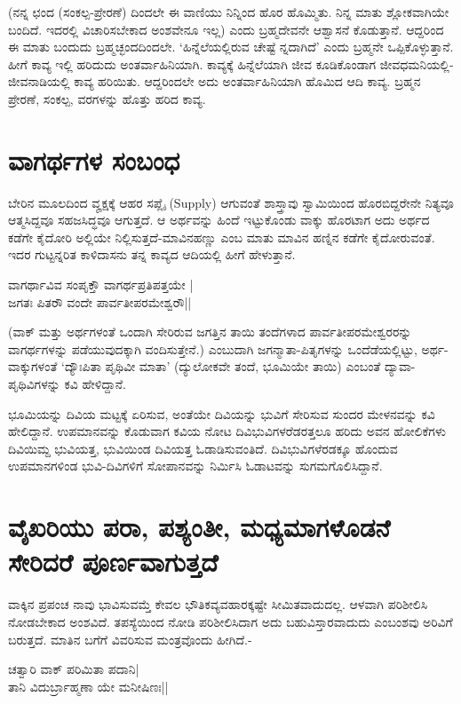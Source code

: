 (ನನ್ನ ಛಂದ (ಸಂಕಲ್ಪ-ಪ್ರೇರಣೆ) ದಿಂದಲೇ ಈ ವಾಣಿಯು ನಿನ್ನಿಂದ ಹೊರ ಹೊಮ್ಮಿತು. ನಿನ್ನ ಮಾತು ಶ್ಲೋಕವಾಗಿಯೇ ಬಂದಿದೆ. ಇದರಲ್ಲಿ ವಿಚಾರಿಸಬೇಕಾದ ಅಂಶವೇನೂ ಇಲ್ಲ) ಎಂದು ಬ್ರಹ್ಮದೇವನೇ ಆಶ್ವಾಸನೆ ಕೊಡುತ್ತಾನೆ. ಆದ್ದರಿಂದ ಈ ಮಾತು ಬಂದುದು ಬ್ರಹ್ಮಚ್ಛಂದದಿಂದಲೇ. `ಹಿನ್ನೆಲೆಯಲ್ಲಿರುವ ಚೇಷ್ಟೆ  ನ್ನದಾಗಿದೆ' ಎಂದು ಬ್ರಹ್ಮನೇ ಒಪ್ಪಿಕೊಳ್ಳುತ್ತಾನೆ. ಹೀಗೆ ಕಾವ್ಯ ಇಲ್ಲಿ ಹರಿದುದು ಅಂತರ್ವಾಹಿನಿಯಾಗಿ. ಕಾವ್ಯಕ್ಕೆ ಹಿನ್ನೆಲೆಯಾಗಿ ಜೀವ ಕೂಡಿಕೊಂಡಾಗ ಜೀವಧಮನಿಯಲ್ಲಿ- ಜೀವನಾಡಿಯಲ್ಲಿ ಕಾವ್ಯ ಹರಿಯಿತು. ಆದ್ದರಿಂದಲೇ ಅದು ಅಂತರ್ವಾಹಿನಿಯಾಗಿ ಹೊಮಿದ ಆದಿ ಕಾವ್ಯ. ಬ್ರಹ್ಮನ ಪ್ರೇರಣೆ, ಸಂಕಲ್ಪ, ವರಗಳನ್ನು ಹೊತ್ತು ಹರಿದ ಕಾವ್ಯ. 

\section*{ವಾಗರ್ಥಗಳ ಸಂಬಂಧ}

ಬೇರಿನ ಮೂಲದಿಂದ ವೄಕ್ಷಕ್ಕೆ  ಆಹರ ಸಪ್ಲೈ (Supply) ಆಗುವಂತೆ ಶಾಸ್ತ್ರಾವು ಸ್ವಾಮಿಯಿಂದ ಹೊರಬಿದ್ದರೇನೇ ನಿತ್ಯವೂ ಆತ್ಮಸಿದ್ದವೂ ಸಹಜಸಿದ್ಧವೂ ಆಗುತ್ತದೆ. ಆ ಅರ್ಥವನ್ನು ಹಿಂದೆ ಇಟ್ಟುಕೊಂಡು ವಾಕ್ಕು ಹೊರಟಾಗ ಅದು ಅರ್ಥದ ಕಡೆಗೇ ಕೈದೋರಿ ಅಲ್ಲಿಯೇ ನಿಲ್ಲಿಸುತ್ತದೆ-ಮಾವಿನಹಣ್ಣು ಎಂಬ ಮಾತು ಮಾವಿನ ಹಣ್ನಿನ ಕಡೆಗೇ ಕೈದೋರುವಂತೆ. ಇದರ ಗುಟ್ಟನ್ನರಿತ ಕಾಳಿದಾಸನು ತನ್ನ ಕಾವ್ಯದ ಆದಿಯಲ್ಲಿ ಹೀಗೆ ಹೇಳುತ್ತಾನೆ.

\begin{shloka}
ವಾಗರ್ಥಾವಿವ ಸಂಪೃಕ್ತೌ ವಾಗರ್ಥಪ್ರತಿಪತ್ತಯೇ |\\
ಜಗತಃ ಪಿತರೌ ವಂದೇ ಪಾರ್ವತೀಪರಮೇಶ್ವರೌ||
\end{shloka}

(ವಾಕ್ ಮತ್ತು ಅರ್ಥಗಳಂತೆ ಒಂದಾಗಿ ಸೇರಿರುವ ಜಗತ್ತಿನ ತಾಯಿ ತಂದೆಗಳಾದ ಪಾರ್ವತೀಪರಮೇಶ್ವರರನ್ನು ವಾಗರ್ಥಗಳನ್ನು ಪಡೆಯುವುದಕ್ಕಾಗಿ ವಂದಿಸುತ್ತೇನೆ.) ಎಂಬುದಾಗಿ ಜಗನ್ಮಾತಾ-ಪಿತೃಗಳನ್ನು ಒಂದೆಡೆಯಲ್ಲಿಟ್ಟು, ಅರ್ಥ-ವಾಕ್ಕುಗಳಂತೆ `ದ್ಯೌಃಪಿತಾ ಪೃಥಿವೀ ಮಾತಾ' (ದ್ಯುಲೋಕವೇ ತಂದೆ, ಭೂಮಿಯೇ ತಾಯಿ) ಎಂಬಂತೆ ದ್ಯಾವಾ-ಪೃಥಿವಿಗಳನ್ನು ಕವಿ ಹೇಳಿದ್ದಾನೆ.

ಭೂಮಿಯನ್ನು ದಿವಿಯ ಮಟ್ಟಕ್ಕೆ  ಏರಿಸುವ, ಅಂತೆಯೇ ದಿವಿಯನ್ನು ಭುವಿಗೆ ಸೇರಿಸುವ ಸುಂದರ ಮೇಳನವನ್ನು ಕವಿ ಹೇಲಿದ್ದಾನೆ. ಉಪಮಾನವನ್ನು ಕೊಡುವಾಗ ಕವಿಯ ನೋಟ ದಿವಿಭುವಿಗಳರೆಡರತ್ತಲೂ ಹರಿದು ಅವನ ಹೋಲಿಕೆಗಳು ದಿವಿಯಿಮ್ದ ಭುವಿಯತ್ತ, ಭುವಿಯಿಂಡ ದಿವಿಯತ್ತ ಓಡಾಡಿಸುವಂತಿದೆ. ದಿವಿಭುವಿಗಳೆರಡಕ್ಕೂ ಹೊಂದುವ ಉಪಮಾನಗಳಿಂಡ ಭುವಿ-ದಿವಿಗಳಿಗೆ ಸೋಪಾನವನ್ನು  ನಿರ್ಮಿಸಿ ಓಡಾಟವನ್ನು ಸುಗಮಗೊಲಿಸಿದ್ದಾನೆ.

\section*{ವೈಖರಿಯು ಪರಾ, ಪಶ್ಯಂತೀ, ಮಧ್ಯಮಾಗಳೊಡನೆ ಸೇರಿದರೆ ಪೂರ್ಣವಾಗುತ್ತದೆ}

ವಾಕ್ಕಿನ ಪ್ರಪಂಚ ನಾವು ಭಾವಿಸುವಮ್ತೆ ಕೇವಲ ಭೌತಿಕವ್ಯವಹಾರಕ್ಕಷ್ಟೇ ಸೀಮಿತವಾದುದಲ್ಲ. ಆಳವಾಗಿ ಪರಿಶೀಲಿಸಿ ನೋಡಬೇಕಾದ ಅಂಶವಿದೆ. ತಪಸ್ಯೆಯಿಂದ ನೋಡಿ ಪರಿಶೀಲಿಸಿದಾಗ ಅದು ಬಹುವಿಸ್ತಾರವಾದುದು ಎಂಬಂಶವು ಅರಿವಿಗೆ ಬರುತ್ತದೆ. ಮಾತಿನ ಬಗೆಗೆ ವಿವರಿಸುವ ಮಂತ್ರವೊಂದು ಹೀಗಿದೆ.-
\begin{shloka}
ಚತ್ವಾರಿ ವಾಕ್ ಪರಿಮಿತಾ ಪದಾನಿ|\\
ತಾನಿ ವಿದುರ್ಬ್ರಾಹ್ಮಣಾ ಯೇ ಮನೀಷಿಣಃ||
\end{shloka}

